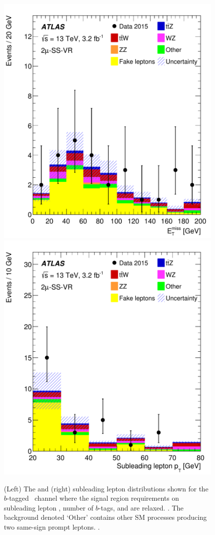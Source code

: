 \begin{figure}[htbp]
\centering
\includegraphics[width=\twofigwidth]{SS2mu1b_MET}
\includegraphics[width=\twofigwidth]{SS2mu1b_pT_2lep}
\caption{\label{fig:ssmm_val} (Left) The \met and (right) subleading lepton \pT 
distributions shown for the $b$-tagged \SSLSR\ channel where the signal region
requirements on subleading lepton \pT, number of $b$-tags, and \met are
relaxed. \hatch.  The background denoted `Other' contains other SM processes
producing two same-sign prompt leptons.  \oflo.} 
\end{figure}


